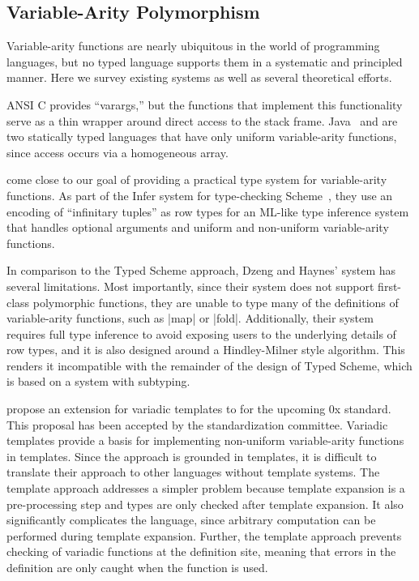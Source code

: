 \begin{schemeregion}
\section{Variable-Arity Polymorphism}
\label{sec:esop-related}

Variable-arity functions are nearly ubiquitous in the world of programming
languages, but no typed language supports them in a systematic and
principled manner.  Here we survey existing systems as well as several
theoretical efforts.

ANSI C provides ``varargs,'' but the functions that
implement this functionality serve as a thin wrapper around direct
access to the stack frame.  Java~\cite{jls3} and \csharp{} are two
statically typed languages that have only uniform variable-arity
functions, since access occurs via a homogeneous array.

\citet{dh:var-ar} come close to our goal of providing a
practical type system for variable-arity functions.  As part of the
Infer system for type-checking Scheme~\cite{h:infer}, they use an
encoding of ``infinitary tuples'' as row types for an ML-like type
inference system that handles optional arguments and uniform and
non-uniform variable-arity functions.

In comparison to the Typed Scheme approach, Dzeng and Haynes' system has several
limitations.  Most importantly, since their system does not support
first-class polymorphic functions, they are unable to type many of the
definitions of variable-arity functions, such as \scheme|map| or
\scheme|fold|.  Additionally, their system requires full type
inference to avoid exposing users to the underlying details of row
types, and it is also designed around a Hindley-Milner style
algorithm. This renders it incompatible with the remainder of the
design of Typed Scheme, which is based on a system with subtyping.

\citet{cpp-varity} propose an extension for
variadic templates to \cpp{} for the upcoming \cpp{}0x standard.  This
proposal has been accepted by the \cpp{} standardization committee.
Variadic templates provide a basis for implementing non-uniform
variable-arity functions in templates.  Since the approach is grounded
in templates, it is difficult to translate their approach to other
languages without template systems.  
The template approach addresses a simpler problem because template expansion
 is a pre-processing step and types are only checked after template expansion. 
It also significantly complicates the language,
 since arbitrary computation can be performed during template expansion.
Further, the template approach prevents checking of variadic functions
at the definition site, meaning that errors in the definition are only
caught when the function is used.


\end{schemeregion}
